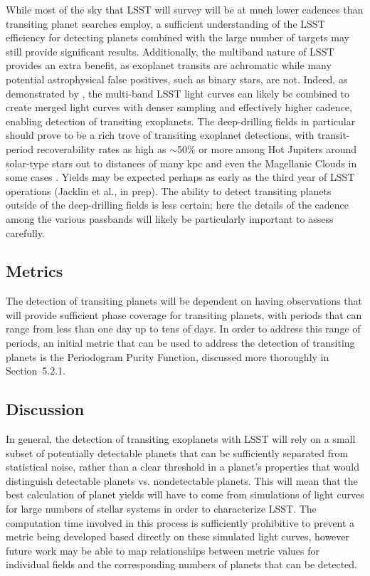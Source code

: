 While most of the sky that LSST will survey will be at much lower
cadences than transiting planet searches employ, a sufficient
understanding of the LSST efficiency for detecting planets combined with
the large number of targets may still provide significant results.
Additionally, the multiband nature of LSST provides an extra benefit, as
exoplanet transits are achromatic while many potential astrophysical
false positives, such as binary stars, are not.
Indeed, as demonstrated by \citet{2015AJ....149...16L}, the multi-band LSST light curves
can likely be combined to create merged light curves with denser sampling and effectively
higher cadence, enabling detection of transiting exoplanets. The deep-drilling fields in
particular should prove to be a rich trove of transiting exoplanet detections, with
transit-period recoverability rates as high as $\sim$50\% or more among Hot Jupiters around
solar-type stars out to distances of many kpc and even the Magellanic Clouds in some cases
\citep{2015AJ....149...16L,2015AJ....150...34J}.
Yields may be expected perhaps as early as the third year of LSST operations
(Jacklin et al., in prep).
The ability to detect transiting planets outside of the deep-drilling fields is less certain;
here the details of the cadence among the various passbands will likely be particularly
important to assess carefully.


\subsection{Metrics}
\label{sec:\secname:metrics}
The detection of transiting planets will be dependent on having observations
that will provide sufficient phase coverage for transiting planets, with periods
that can range from less than one day up to tens of days. In order to address
this range of periods, an initial metric that can be used to address the detection
of transiting planets is the Periodogram Purity Function, discussed more thoroughly
in Section~5.2.1.

\subsection{Discussion}
\label{sec:\secname:discussion}
In general, the detection of transiting exoplanets with LSST will rely on
a small subset of potentially detectable planets that can be sufficiently
separated from statistical noise, rather than a clear threshold in a planet's
properties that would distinguish detectable planets vs. nondetectable planets.
This will mean that the best calculation of planet yields will have to come
from simulations of light curves for large numbers of stellar systems in order
to characterize LSST. The computation time involved in this process is sufficiently
prohibitive to prevent a metric being developed based directly on these
simulated light curves, however future work may be able to map relationships
between metric values for individual fields and the corresponding numbers
of planets that can be detected.

